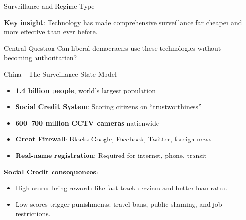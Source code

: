 ﻿\documentclass[aspectratio=169,11pt]{beamer}
\begin{document}
\begin{frame}{Surveillance and Regime Type}
\begin{center}
\end{center}

\vspace{0.3em}
\textbf{Key insight}: Technology has made comprehensive surveillance far cheaper and more effective than ever before.

\begin{alertblock}{Central Question}
Can liberal democracies use these technologies without becoming authoritarian?
\end{alertblock}
\end{frame}

\begin{frame}{China---The Surveillance State Model}
\begin{objectionbox}
\small
\begin{itemize}
    \item \textbf{1.4 billion people}, world's largest population
    \item \textbf{Social Credit System}: Scoring citizens on ``trustworthiness''
    \item \textbf{600--700 million CCTV cameras} nationwide
    \item \textbf{Great Firewall}: Blocks Google, Facebook, Twitter, foreign news
    \item \textbf{Real-name registration}: Required for internet, phone, transit
\end{itemize}
\end{objectionbox}

\vspace{0.2em}
\vspace{0.2em}
\textbf{Social Credit consequences}:
\begin{itemize}
    \item High scores bring rewards like fast-track services and better loan rates.
    \item Low scores trigger punishments: travel bans, public shaming, and job restrictions.
\end{itemize}
\end{frame}
\end{document}
